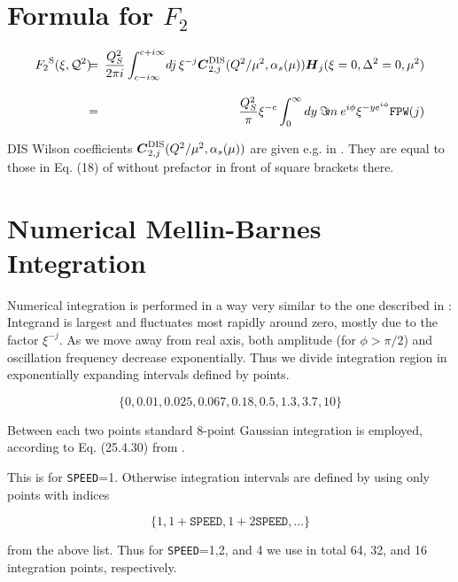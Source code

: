 \documentclass[12pt]{article}
\begin{document}
\section{Formula for $F_2$}  

\begin{eqnarray*}
{{F_2}^{\rm S}}(\xi,{\cal Q}^2)
&\!\!\!=\!\!\!& \frac{Q_{S}^2}{2 \pi i}\int_{c-i \infty}^{c+ i \infty}\!
dj\,\xi^{-j}
\mbox{\boldmath $C$}^{\rm DIS}_{2,j}(Q^2/\mu^2,\alpha_s(\mu))
\mbox{\boldmath $H$}_{j} (\xi=0,\Delta^2=0,\mu^2) \\[2ex]
&\!\!\!=\!\!\!& \frac{Q_{S}^2}{\pi} \xi^{-c}
\int_{0}^{\infty} dy\: \Im\! m\: e^{i\phi} \xi^{- y e^{i\phi}}
\texttt{FPW}(j)
\label{<F2formula>}
\end{eqnarray*}

DIS Wilson coefficients $\mbox{\boldmath $C$}^{\rm DIS}_{2,j}(Q^2/\mu^2,\alpha_s(\mu))$
are given e.g. in \cite{vanNeerven:2000uj}. They are equal to those in
 Eq. (18) of \cite{Kumericki:2006xx} without prefactor in front of square brackets there.

\section{Numerical Mellin-Barnes Integration}  
\label{sect:Integration}
Numerical integration is performed in a way very similar to the one described in
\cite{Vogt:2004ns}: Integrand is largest and
fluctuates most rapidly around zero, mostly due to the factor $\xi^{-j}$. As we
move away from real axis, both
amplitude (for $\phi > \pi/2$) and oscillation frequency decrease exponentially.
Thus we divide integration region in exponentially expanding intervals
defined by points.

\begin{equation}
 \{0, 0.01, 0.025, 0.067, 0.18, 0.5, 1.3, 3.7, 10\}
\label{<intervals>}
\end{equation}

Between each two points standard 8-point Gaussian integration is employed, according
to Eq. (25.4.30) from \cite{AbS}.

This is for \texttt{SPEED}=1. Otherwise integration intervals are defined by using
only points with indices

\begin{equation}
 \{ 1, 1 + \texttt{SPEED}, 1 + 2 \texttt{SPEED}, \ldots \}
\label{<speedintervals>}
\end{equation}

from the above list. Thus for \texttt{SPEED}=1,2, and 4 we use in total 64, 32, and 16
integration points, respectively.
\end{document}
